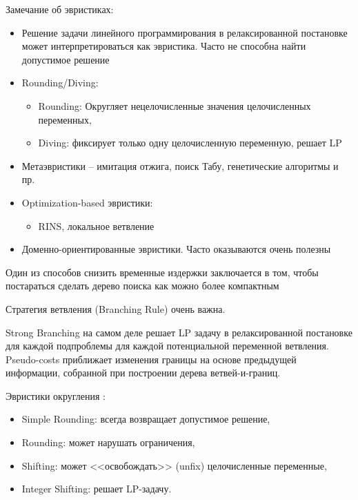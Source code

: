 \documentclass[%
	11pt,
	a4paper,
	utf8,
		]{article}
\begin{document}
Замечание об эвристиках:
\begin{itemize}
	\item Решение задачи линейного программирования в релаксированной постановке может интерпретироваться как эвристика. Часто не способна найти допустимое решение
	
	\item Rounding/Diving:
	\begin{itemize}
		\item Rounding: Округляет нецелочисленные значения целочисленных переменных,
		
		\item Diving: фиксирует только одну целочисленную переменную, решает LP
	\end{itemize}

    \item Метаэвристики -- имитация отжига, поиск Табу, генетические алгоритмы и пр.
    
    \item Optimization-based эвристики:
    \begin{itemize}
    	\item RINS, локальное ветвление
    \end{itemize}

    \item Доменно-ориентированные эвристики. Часто оказываются очень полезны
\end{itemize}

Один из способов снизить временные издержки заключается в том, чтобы постараться сделать дерево поиска как можно более компактным

Стратегия ветвления (Branching Rule) очень важна.

Strong Branching на самом деле решает LP задачу в релаксированной постановке для каждой подпроблемы для каждой потенциальной переменной ветвления. Pseudo-costs приближает изменения границы на основе предыдущей информации, собранной при построении дерева ветвей-и-границ.

Эвристики округления \cite{berthold:primal_heur_scip}:
\begin{itemize}
	\item Simple Rounding: всегда возвращает допустимое решение,
	
	\item Rounding: может нарушать ограничения,
	
	\item Shifting: может <<освобождать>> (unfix) целочисленные переменные,
	
	\item Integer Shifting: решает LP-задачу.
\end{itemize}
\end{document}
